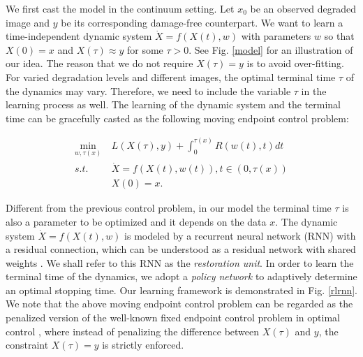 \documentclass{article} %
\begin{document}
We first cast the model in the continuum setting. Let $x_0$ be an observed degraded image
and $y$ be its corresponding damage-free counterpart. We want to learn
a time-independent dynamic system $\dot{X}=f(X(t),w)$ with parameters $w$
so that $X(0)=x$ and $X(\tau)\approx y$ for some $\tau>0$. See
Fig. \ref{model} for an illustration of our idea. The reason that we
do not require $X(\tau)=y$ is to avoid over-fitting. For varied
degradation levels and different images, the optimal terminal time $\tau$
of the dynamics may vary. Therefore, we need to include the variable $\tau$
in the learning process as well. The learning of the dynamic system and
the terminal time can be gracefully casted as the following
moving endpoint control problem:

\begin{align}
\min_{w,\tau(x)}&\ L(X(\tau),y)+\int_{0}^{\tau(x)} R(w(t),t)dt \nonumber \\
s.t.&\ \dot{X}=f(X(t),w(t)), t\in(0,\tau(x)) \\
&\ X(0)=x.\nonumber
\end{align}\label{Model:Continuum}

Different from the previous control problem, in our model
the terminal time $\tau$ is also a parameter to be optimized and it depends on the data $x$.
The dynamic system $\dot{X}=f(X(t),w)$ is modeled by a recurrent neural network (RNN)
with a residual connection, which can be understood as a residual network with
shared weights \citep{Liao2016Bridging}. We shall refer to this RNN as
the \textit{restoration unit}. In order to learn the terminal time of
the dynamics, we adopt a \textit{policy network} to adaptively determine
an optimal stopping time. Our learning framework is demonstrated
in Fig. \ref{rlrnn}. We note that the above moving endpoint control problem
can be regarded as the penalized version of the well-known fixed endpoint control
problem in optimal control \citep{Evans2005An}, where instead of penalizing
the difference between $X(\tau)$ and $y$, the constraint $X(\tau)=y$ is
strictly enforced.
\end{document}
